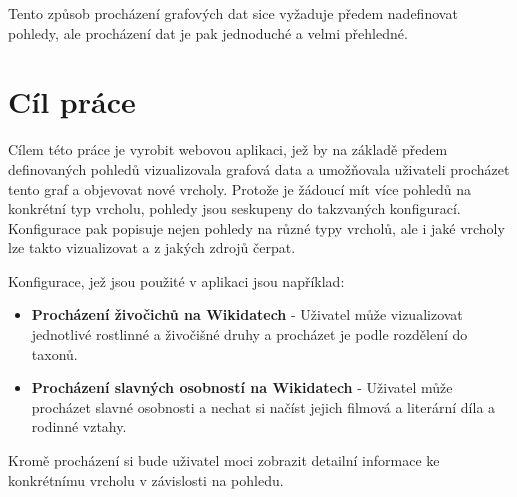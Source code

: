 Tento způsob procházení grafových dat sice vyžaduje předem nadefinovat pohledy, ale procházení dat je pak jednoduché a velmi přehledné.

\section{Cíl práce}

Cílem této práce je vyrobit webovou aplikaci, jež by na základě předem definovaných pohledů vizualizovala grafová data a umožňovala uživateli procházet tento graf a objevovat nové vrcholy. Protože je žádoucí mít více pohledů na konkrétní typ vrcholu, pohledy jsou seskupeny do takzvaných konfigurací. Konfigurace pak popisuje nejen pohledy na různé typy vrcholů, ale i jaké vrcholy lze takto vizualizovat a z jakých zdrojů čerpat.

Konfigurace, jež jsou použité v aplikaci jsou například:
\begin{itemize}
    \item \textbf{Procházení živočichů na Wikidatech} - Uživatel může vizualizovat jednotlivé rostlinné a živočišné druhy a procházet je podle rozdělení do taxonů.
    \item \textbf{Procházení slavných osobností na Wikidatech} - Uživatel může procházet slavné osobnosti a nechat si načíst jejich filmová a literární díla a rodinné vztahy.
\end{itemize}

Kromě procházení si bude uživatel moci zobrazit detailní informace ke konkrétnímu vrcholu v závislosti na pohledu.
